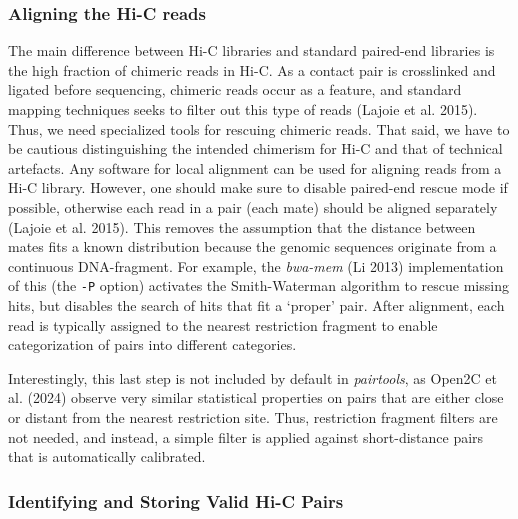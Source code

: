 \documentclass[
  11pt,
  a4paper,
]{scrbook}
\begin{document}
\subsubsection{Aligning the Hi-C reads}\label{aligning-the-hi-c-reads}

The main difference between Hi-C libraries and standard paired-end
libraries is the high fraction of chimeric reads in Hi-C. As a contact
pair is crosslinked and ligated before sequencing, chimeric reads occur
as a feature, and standard mapping techniques seeks to filter out this
type of reads (Lajoie et al. 2015). Thus, we need specialized tools for
rescuing chimeric reads. That said, we have to be cautious
distinguishing the intended chimerism for Hi-C and that of technical
artefacts. Any software for local alignment can be used for aligning
reads from a Hi-C library. However, one should make sure to disable
paired-end rescue mode if possible, otherwise each read in a pair (each
mate) should be aligned separately (Lajoie et al. 2015). This removes
the assumption that the distance between mates fits a known distribution
because the genomic sequences originate from a continuous DNA-fragment.
For example, the \emph{bwa-mem} (Li 2013) implementation of this (the
\texttt{-P} option) activates the Smith-Waterman algorithm to rescue
missing hits, but disables the search of hits that fit a `proper' pair.
After alignment, each read is typically assigned to the nearest
restriction fragment to enable categorization of pairs into different
categories.

Interestingly, this last step is not included by default in
\emph{pairtools}, as Open2C et al. (2024) observe very similar
statistical properties on pairs that are either close or distant from
the nearest restriction site. Thus, restriction fragment filters are not
needed, and instead, a simple filter is applied against short-distance
pairs that is automatically calibrated.

\subsubsection{Identifying and Storing Valid Hi-C
Pairs}\label{identifying-and-storing-valid-hi-c-pairs}
\end{document}

